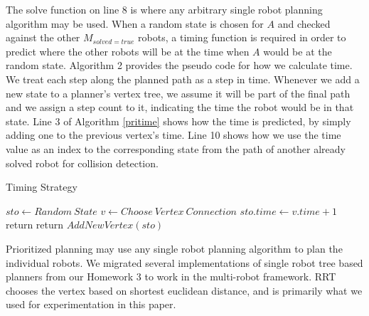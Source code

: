 \documentclass[12pt,journal,compsoc]{IEEEtran}
\begin{document}
The solve function on line 8 is where any arbitrary single robot planning algorithm may be used. When a random state is chosen for $A$ and checked against the other $M_{solved=true}$ robots, a timing function is required in order to predict where the other robots will be at the time when $A$ would be at the random state. Algorithm 2 provides the pseudo code for how we calculate time. We treat each step along the planned path as a step in time. Whenever we add a new state to a planner's vertex tree, we assume it will be part of the final path and we assign a step count to it, indicating the time the robot would be in that state. Line 3 of Algorithm \ref{pritime} shows how the time is predicted, by simply adding one to the previous vertex's time. Line 10 shows how we use the time value as an index to the corresponding state from the path of another already solved robot for collision detection.

\begin{algorithm}
\caption{Timing Strategy}\label{pritime}
\begin{algorithmic}[1]
\State $sto \gets Random~State$
\State $v \gets Choose~Vertex~Connection$
\State $sto.time \gets v.time + 1$
\State return
\EndIf
\EndFor
{}
\State return
\EndIf
\EndFor
\State $AddNewVertex(sto)$
\end{algorithmic}
\end{algorithm}

\par
Prioritized planning may use any single robot planning algorithm to plan the individual robots. We migrated several implementations of single robot tree based planners from our Homework 3 to work in the multi-robot framework. RRT chooses the vertex based on shortest euclidean distance, and is primarily what we used for experimentation in this paper.
\end{document}
